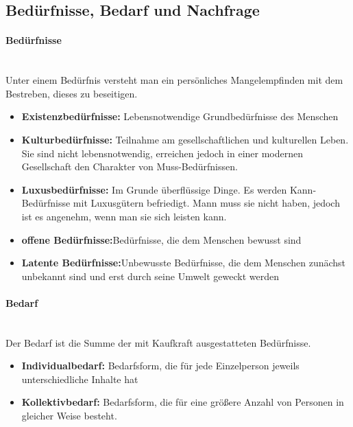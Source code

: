 
\subsection{Bedürfnisse, Bedarf und Nachfrage}

\paragraph{Bedürfnisse}~\\
Unter einem Bedürfnis versteht man ein persönliches Mangelempfinden mit dem Bestreben, dieses zu beseitigen.

\begin{itemize}
\setlength\itemsep{0em}
	\item \textbf{Existenzbedürfnisse:} Lebensnotwendige Grundbedürfnisse des Menschen
	\item \textbf{Kulturbedürfnisse:} Teilnahme am gesellschaftlichen und kulturellen Leben. Sie sind nicht lebensnotwendig, erreichen jedoch in einer modernen Gesellschaft den Charakter von Muss-Bedürfnissen.
	\item \textbf{Luxusbedürfnisse:} Im Grunde überflüssige Dinge. Es werden Kann-Bedürfnisse mit Luxusgütern befriedigt. Mann muss sie nicht haben, jedoch ist es angenehm, wenn man sie sich leisten kann.
	\item \textbf{offene Bedürfnisse:}Bedürfnisse, die dem Menschen bewusst sind
	\item \textbf{Latente Bedürfnisse:}Unbewusste Bedürfnisse, die dem Menschen zunächst unbekannt sind und erst durch seine Umwelt geweckt werden
\end{itemize}
	
	
\paragraph{Bedarf}~\\
Der Bedarf ist die Summe der mit Kaufkraft ausgestatteten Bedürfnisse.

\begin{itemize}
\setlength\itemsep{0em}
	\item \textbf{Individualbedarf:} Bedarfsform, die für jede Einzelperson jeweils unterschiedliche Inhalte hat
	\item \textbf{Kollektivbedarf:} Bedarfsform, die für eine größere Anzahl von Personen in gleicher Weise besteht.
\end{itemize}
	

